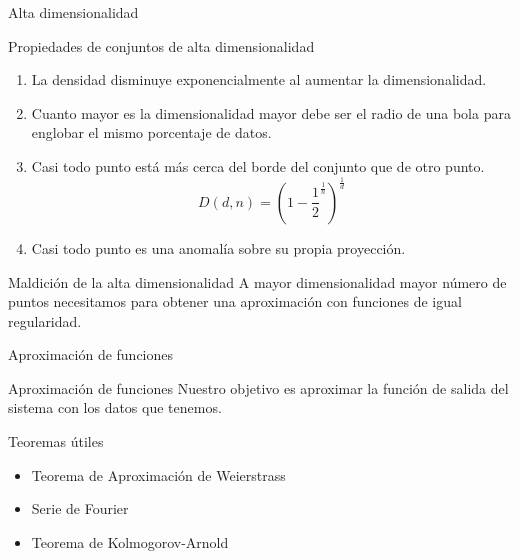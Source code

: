 \documentclass[10pt]{beamer}
\begin{document}
\begin{frame}[fragile]{Alta dimensionalidad}
\vspace{10px}
\pause
{}

\begin{block}{Propiedades de conjuntos de alta dimensionalidad}
	\begin{enumerate}
		\item La densidad disminuye exponencialmente al aumentar la dimensionalidad.
		\pause
		\item Cuanto mayor es la dimensionalidad mayor debe ser el radio de una bola para englobar el mismo porcentaje de datos.
		\pause
		\item Casi todo punto está más cerca del borde del conjunto que de otro punto. 
		$$D(d,n) = (1-\frac{1}{2}^{\frac{1}{n}})^{\frac{1}{d}}$$
		\pause
		\item Casi todo punto es una anomalía sobre su propia proyección.
	\end{enumerate}
\end{block}

\pause

\begin{alertblock}{Maldición de la alta dimensionalidad}
	A mayor dimensionalidad mayor número de puntos necesitamos para obtener una aproximación con funciones de igual regularidad.
\end{alertblock}

\end{frame}

\begin{frame}[fragile]{Aproximación de funciones}
\vspace{10px}
\pause
{}

\begin{alertblock}{Aproximación de funciones}
	Nuestro objetivo es aproximar la función de salida del sistema con los datos que tenemos.
\end{alertblock}

\pause

\begin{block}{Teoremas útiles}
	\begin{itemize}
		\item Teorema de Aproximación de Weierstrass
		\pause
		\item Serie de Fourier
		\pause
		\item Teorema de Kolmogorov-Arnold
	\end{itemize}
\end{block}

\end{frame}
\end{document}
